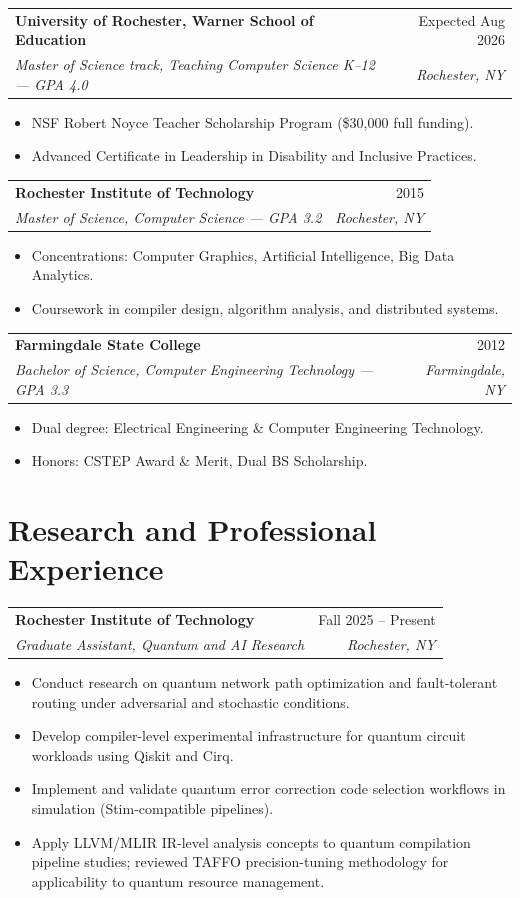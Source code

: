 \documentclass[11pt]{article}
\makeatletter
\newcommand{\entry}[4]{
  \noindent\begin{tabularx}{\textwidth}{@{}Xr@{}}
    \textbf{#1} & #2 \\
    \textit{#3} & \textit{#4}
  \end{tabularx}\vspace{2pt}
}
\makeatother
\begin{document}
\entry{University of Rochester, Warner School of Education}{Expected Aug 2026}{Master of Science track, Teaching Computer Science K--12 --- GPA 4.0}{Rochester, NY}
\begin{itemize}
  \item NSF Robert Noyce Teacher Scholarship Program (\$30,000 full funding).
  \item Advanced Certificate in Leadership in Disability and Inclusive Practices.
\end{itemize}

\entry{Rochester Institute of Technology}{2015}{Master of Science, Computer Science --- GPA 3.2}{Rochester, NY}
\begin{itemize}
  \item Concentrations: Computer Graphics, Artificial Intelligence, Big Data Analytics.
  \item Coursework in compiler design, algorithm analysis, and distributed systems.
\end{itemize}

\entry{Farmingdale State College}{2012}{Bachelor of Science, Computer Engineering Technology --- GPA 3.3}{Farmingdale, NY}
\begin{itemize}
  \item Dual degree: Electrical Engineering \& Computer Engineering Technology.
  \item Honors: CSTEP Award \& Merit, Dual BS Scholarship.
\end{itemize}

\section{Research and Professional Experience}

\entry{Rochester Institute of Technology}{Fall 2025 -- Present}{Graduate Assistant, Quantum and AI Research}{Rochester, NY}
\begin{itemize}
  \item Conduct research on quantum network path optimization and fault-tolerant routing under adversarial and stochastic conditions.
  \item Develop compiler-level experimental infrastructure for quantum circuit workloads using Qiskit and Cirq.
  \item Implement and validate quantum error correction code selection workflows in simulation (Stim-compatible pipelines).
  \item Apply LLVM/MLIR IR-level analysis concepts to quantum compilation pipeline studies; reviewed TAFFO precision-tuning methodology for applicability to quantum resource management.
\end{itemize}
\end{document}
